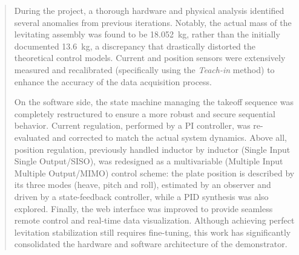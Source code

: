 \begin{abstract}
    During the project, a thorough hardware and physical analysis identified several anomalies from previous iterations. Notably, the actual mass of the levitating assembly was found to be 18.052~kg, rather than the initially documented 13.6~kg, a discrepancy that drastically distorted the theoretical control models. Current and position sensors were extensively measured and recalibrated (specifically using the \textit{Teach-in} method) to enhance the accuracy of the data acquisition process.

    On the software side, the state machine managing the takeoff sequence was completely restructured to ensure a more robust and secure sequential behavior. Current regulation, performed by a PI controller, was re-evaluated and corrected to match the actual system dynamics. Above all, position regulation, previously handled inductor by inductor (Single Input Single Output/SISO), was redesigned as a multivariable (Multiple Input Multiple Output/MIMO) control scheme: the plate position is described by its three modes (heave, pitch and roll), estimated by an observer and driven by a state-feedback controller, while a PID synthesis was also explored. Finally, the web interface was improved to provide seamless remote control and real-time data visualization. Although achieving perfect levitation stabilization still requires fine-tuning, this work has significantly consolidated the hardware and software architecture of the demonstrator.

\end{abstract}